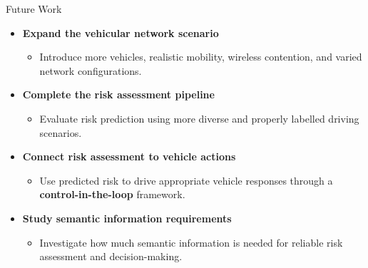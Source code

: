\documentclass[aspectratio=169]{beamer}
\begin{document}
\begin{frame}{Future Work}

\small

\begin{itemize}

\item \textbf{Expand the vehicular network scenario}
\begin{itemize}
    \item Introduce more vehicles, realistic mobility, wireless
    contention, and varied network configurations.
\end{itemize}

\item \textbf{Complete the risk assessment pipeline}
\begin{itemize}
    \item Evaluate risk prediction using more diverse and properly
    labelled driving scenarios.
\end{itemize}

\item \textbf{Connect risk assessment to vehicle actions}
\begin{itemize}
    \item Use predicted risk to drive appropriate vehicle responses
    through a \textbf{control-in-the-loop} framework.
\end{itemize}

\item \textbf{Study semantic information requirements}
\begin{itemize}
    \item Investigate how much semantic information is needed for
    reliable risk assessment and decision-making.
\end{itemize}

\end{itemize}

\end{frame}
\end{document}
